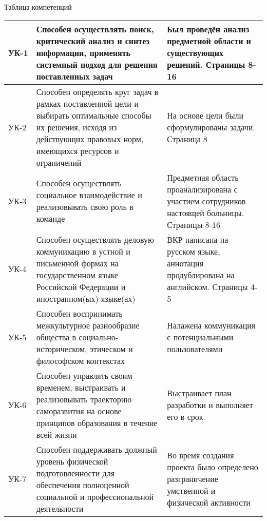 \documentclass[a4paper,article]{article}
\begin{document}
    \begin{sloppypar}
        \begin{center}
            Таблица компетенций
        \end{center}
        
        
        \begin{xltabular}{\textwidth} { |
                >{\hsize} X |
                >{\hsize} X |
                >{\hsize} X | }
            
            \hline
            УК-1
            & Способен осуществлять поиск, критический анализ и синтез информации, применять системный подход для решения поставленных задач
            & Был проведён анализ предметной области и существующих решений. Страницы 8-16 \\
            \hline
            УК-2
            & Способен определять круг задач в рамках поставленной цели и выбирать оптимальные способы их решения, исходя из действующих правовых норм, имеющихся ресурсов и ограничений
            & На основе цели были сформулированы задачи. Страница 8 \\
            \hline
            УК-3
            & Способен осуществлять социальное взаимодействие и реализовывать свою роль в команде
            & Предметная область проанализирована с участием сотрудников настоящей больницы. Страницы 8-16 \\
            \hline
            УК-4
            & Способен осуществлять деловую коммуникацию в устной и письменной формах на государственном языке Российской Федерации и иностранном(ых) языке(ах)
            & ВКР написана на русском языке, аннотация продублирована на английском. Страницы 4-5 \\
            \hline
            УК-5
            & Способен воспринимать межкультурное разнообразие общества в социально-историческом, этическом и философском контекстах
            & Налажена коммуникация с потенциальными пользователями \\
            \hline
            УК-6
            & Способен управлять своим временем, выстраивать и реализовывать траекторию саморазвития на основе принципов образования в течение всей жизни 
            & Выстраивает план разработки и выполняет его в срок \\
            \hline
            УК-7
            & Способен поддерживать должный уровень физической подготовленности для обеспечения полноценной социальной и профессиональной деятельности
            & Во время создания проекта было определено разграничение умственной и физической активности \\

\end{xltabular}
\end{sloppypar}
\end{document}
